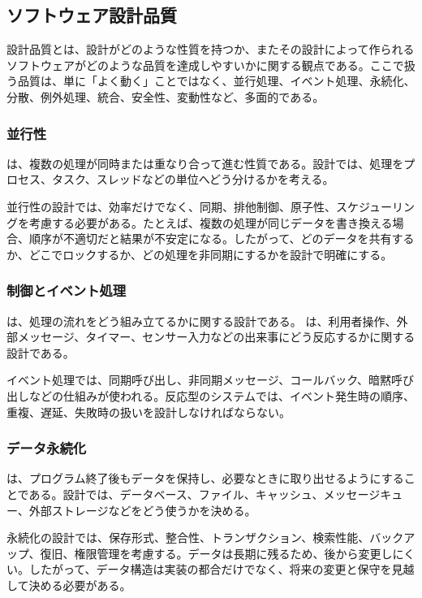 \subsection{ソフトウェア設計品質}

設計品質とは、設計がどのような性質を持つか、またその設計によって作られるソフトウェアがどのような品質を達成しやすいかに関する観点である。ここで扱う品質は、単に「よく動く」ことではなく、並行処理、イベント処理、永続化、分散、例外処理、統合、安全性、変動性など、多面的である。

\subsubsection{並行性}

 は、複数の処理が同時または重なり合って進む性質である。設計では、処理をプロセス、タスク、スレッドなどの単位へどう分けるかを考える。

並行性の設計では、効率だけでなく、同期、排他制御、原子性、スケジューリングを考慮する必要がある。たとえば、複数の処理が同じデータを書き換える場合、順序が不適切だと結果が不安定になる。したがって、どのデータを共有するか、どこでロックするか、どの処理を非同期にするかを設計で明確にする。

\subsubsection{制御とイベント処理}

 は、処理の流れをどう組み立てるかに関する設計である。 は、利用者操作、外部メッセージ、タイマー、センサー入力などの出来事にどう反応するかに関する設計である。

イベント処理では、同期呼び出し、非同期メッセージ、コールバック、暗黙呼び出しなどの仕組みが使われる。反応型のシステムでは、イベント発生時の順序、重複、遅延、失敗時の扱いを設計しなければならない。

\subsubsection{データ永続化}

 は、プログラム終了後もデータを保持し、必要なときに取り出せるようにすることである。設計では、データベース、ファイル、キャッシュ、メッセージキュー、外部ストレージなどをどう使うかを決める。

永続化の設計では、保存形式、整合性、トランザクション、検索性能、バックアップ、復旧、権限管理を考慮する。データは長期に残るため、後から変更しにくい。したがって、データ構造は実装の都合だけでなく、将来の変更と保守を見越して決める必要がある。

